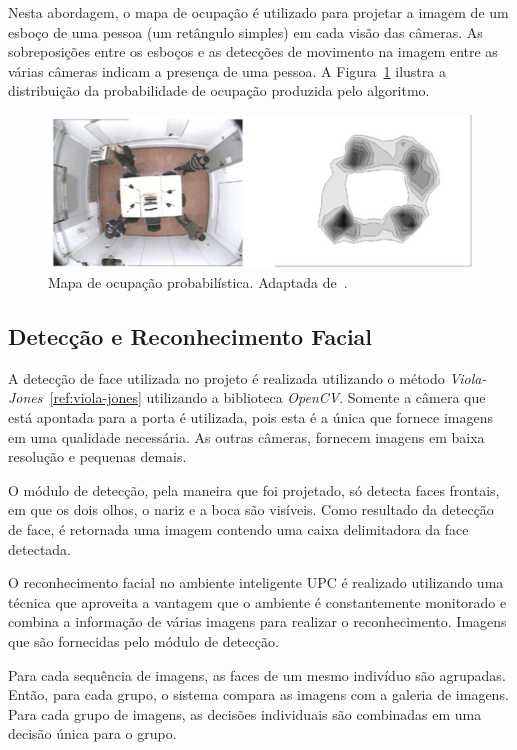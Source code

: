 Nesta abordagem, o mapa de ocupação é utilizado para projetar a imagem de um esboço de uma pessoa (um retângulo simples) em cada visão das câmeras.  As sobreposições entre os esboços e as detecções de movimento na imagem entre as várias câmeras indicam a presença de uma pessoa. A Figura~\ref{fig:pom} ilustra a distribuição da probabilidade de ocupação produzida pelo algoritmo. 

\begin{figure}[hbt]
		\begin{center}
			\includegraphics[scale=0.5]{figuras/3.TrabalhosCorrelatos/pom.png}
		\end{center}
		\caption{Mapa de ocupação probabilística. Adaptada de~\cite{salah}.}
		\label{fig:pom}
	\end{figure}

\subsection{Detecção e Reconhecimento Facial}

A detecção de face utilizada no projeto é realizada utilizando o método \textit{Viola-Jones}~\ref{ref:viola-jones} utilizando a biblioteca \textit{OpenCV}. Somente a câmera que está apontada para a porta é utilizada, pois esta é a única que fornece imagens em uma qualidade necessária. As outras câmeras, fornecem imagens em baixa resolução e pequenas demais.  

O módulo de detecção, pela maneira que foi projetado, só detecta faces frontais, em que os dois olhos, o nariz e a boca são visíveis. Como resultado da detecção de face, é retornada uma imagem contendo uma caixa delimitadora da face detectada.

O reconhecimento facial no ambiente inteligente UPC é realizado utilizando uma técnica que aproveita a vantagem que o ambiente é constantemente monitorado e combina a informação de várias imagens para realizar o reconhecimento.  Imagens que são fornecidas pelo módulo de detecção.

Para cada sequência de imagens, as faces de um mesmo indivíduo são agrupadas. Então, para cada grupo, o sistema compara as imagens com a galeria de imagens. Para cada grupo de imagens, as decisões individuais são combinadas em uma decisão única para o grupo.

